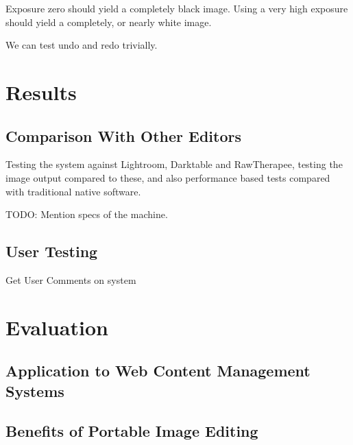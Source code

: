 \documentclass[12pt,a4paper]{article}
\begin{document}
Exposure zero should yield a completely black image. Using a very high exposure should yield a completely, or nearly white image.

We can test undo and redo trivially.
\section{Results}



\subsection{Comparison With Other Editors}
Testing the system against Lightroom, Darktable and RawTherapee,
testing the image output compared to these, and also performance
based tests compared with traditional native software.

TODO: Mention specs of the machine.


\subsection{User Testing}
Get User Comments on system

\subsection{}

\section{Evaluation}


\subsection{Application to Web Content Management Systems}

\subsection{Benefits of Portable Image Editing}
\end{document}
